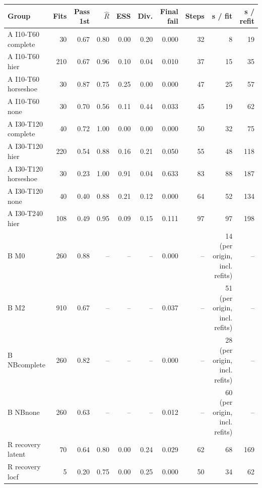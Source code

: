 \documentclass[10pt,a4paper]{article}
\begin{document}
\clearpage

\noindent\begin{minipage}{\linewidth}
\label{tab:S12}
\centering\scriptsize
\begin{tabular}{lrrrrrrrrr}
\toprule
Group & Fits & Pass 1st & $\hat{R}$ & ESS & Div. & Final fail & Steps & s / fit & s / refit \\ \midrule
A I10-T60 complete & 30 & 0.67 & 0.80 & 0.00 & 0.20 & 0.000 & 32 & 8 & 19 \\
A I10-T60 hier & 210 & 0.67 & 0.96 & 0.10 & 0.04 & 0.010 & 37 & 15 & 35 \\
A I10-T60 horseshoe & 30 & 0.87 & 0.75 & 0.25 & 0.00 & 0.000 & 47 & 25 & 57 \\
A I10-T60 none & 30 & 0.70 & 0.56 & 0.11 & 0.44 & 0.033 & 45 & 19 & 62 \\
A I30-T120 complete & 40 & 0.72 & 1.00 & 0.00 & 0.00 & 0.000 & 50 & 32 & 75 \\
A I30-T120 hier & 220 & 0.54 & 0.88 & 0.16 & 0.21 & 0.050 & 55 & 48 & 118 \\
A I30-T120 horseshoe & 30 & 0.23 & 1.00 & 0.91 & 0.04 & 0.633 & 83 & 88 & 187 \\
A I30-T120 none & 40 & 0.40 & 0.88 & 0.21 & 0.12 & 0.000 & 64 & 52 & 134 \\
A I30-T240 hier & 108 & 0.49 & 0.95 & 0.09 & 0.15 & 0.111 & 97 & 97 & 198 \\
B M0 & 260 & 0.88 & – & – & – & 0.000 & – & 14 (per origin, incl. refits) & – \\
B M2 & 910 & 0.67 & – & – & – & 0.037 & – & 51 (per origin, incl. refits) & – \\
B NBcomplete & 260 & 0.82 & – & – & – & 0.000 & – & 28 (per origin, incl. refits) & – \\
B NBnone & 260 & 0.63 & – & – & – & 0.012 & – & 60 (per origin, incl. refits) & – \\
R recovery latent & 70 & 0.64 & 0.80 & 0.00 & 0.24 & 0.029 & 62 & 68 & 169 \\
R recovery locf & 5 & 0.20 & 0.75 & 0.00 & 0.25 & 0.000 & 50 & 34 & 62 \\
\bottomrule
\end{tabular}
\end{minipage}
\vspace{22pt}
\end{document}
